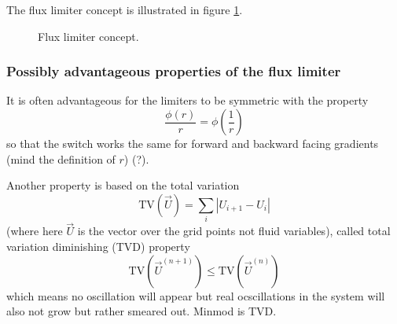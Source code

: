 The flux limiter concept is illustrated in figure \ref{fig:flux_limiter}.

\begin{figure}[htb!]
    \centering
    
    \caption{Flux limiter concept.}
    \label{fig:flux_limiter}
\end{figure}


\subsubsection{Possibly advantageous properties of the flux limiter}
It is often advantageous for the limiters to be symmetric with the property
\begin{equation}
    \frac{\phi(r)}{r} = \phi \left( \frac{1}{r} \right)
\end{equation}
so that the switch works the same for forward and backward facing
gradients (mind the definition of $r$) (?).

Another property is based on the total variation
\begin{equation}
    \text{TV}(\vec{U}) = \sum_i \left| U_{i+1} - U_i \right|
\end{equation}
(where here $\vec{U}$ is the vector over the grid points not fluid variables),
called total variation diminishing (TVD) property
\begin{equation}
    \text{TV}(\vec{U}^{(n+1)}) \leq \text{TV}(\vec{U}^{(n)})
\end{equation}
which means no oscillation will appear but real ocscillations
in the system will also not grow but rather smeared out.
Minmod is TVD.

\pagebreak